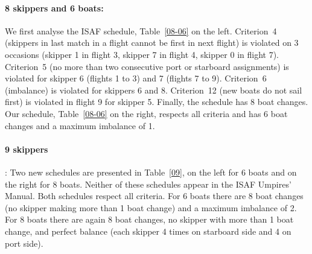 \documentclass{llncs}
\begin{document}
\paragraph{8 skippers and 6 boats:} We first analyse the ISAF schedule, Table~\ref{08-06} on the
left. Criterion~4 (skippers in last match in a flight cannot be first in next flight) is violated on
3 occasions (skipper 1 in flight 3, skipper 7 in flight 4, skipper 0 in flight 7). Criterion~5 (no
more than two consecutive port or starboard assignments) is violated for skipper 6 (flights 1 to 3)
and 7 (flights 7 to 9). Criterion~6 (imbalance) is violated for skippers 6 and 8. Criterion~12  (new
boats do not sail first) is violated in flight 9 for skipper 5. Finally, the schedule has 8 boat
changes. Our schedule, Table~\ref{08-06} on the right, respects all criteria and has 6 boat changes
and a maximum imbalance of 1.

\paragraph{9 skippers}: Two new schedules are presented in Table~\ref{09}, on the left for 6 boats
and on the right for 8 boats. Neither of these schedules appear in the ISAF Umpires' Manual. Both
schedules respect all criteria. For 6 boats there are 8 boat changes (no skipper making more than 1
boat change) and a maximum imbalance of 2. For 8 boats there are again 8 boat changes, no skipper
with more than 1 boat change, and perfect balance (each skipper 4 times on starboard side and 4 on
port side).
\end{document}
